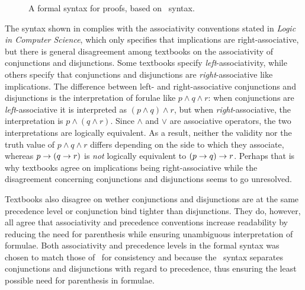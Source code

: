 \documentclass[BA.tex]{subfiles}
\begin{document}
\begin{figure}[H]

\caption{A formal syntax for proofs, based on \bp\ syntax.}
\label{fproof}
\end{figure}


The syntax shown in  complies with the associativity 
conventions stated in \emph{Logic in Computer Science}\cite[p.~5]{hr}, which
only specifies that implications are right-associative, but there is
general disagreement among textbooks on the associativity of conjunctions
and disjunctions. Some textbooks specify 
\emph{left}-associativity\cite[p.~46]{disc}, while others specify that 
conjunctions and disjunctions are \emph{right}-associative like 
implications\cite[p.~11]{math}\cite[p.~5]{calc}. The difference between
left- and right-associative conjunctions and disjunctions is the
interpretation of forulae like \(p \land q \land r\): when conjunctions are
\emph{left}-associative it is interpreted as \((p \land q) \land r\), but
when \emph{right}-associative, the interpretation is \(p \land (q \land r)\).
Since \(\land\) and \(\lor\) are associative operators, the two 
interpretations are logically equivalent. 
As a result, neither the validity nor the truth value of
\(p \land q \land r\) differs depending on the side to which they
associate, whereas \(p \rightarrow (q \rightarrow r)\) is \emph{not} logically equivalent
to \((p \rightarrow q) \rightarrow r\). Perhaps that is why textbooks agree on implications
being right-associative while the disagreement concerning conjunctions and
disjunctions seems to go unresolved.

Textbooks also disagree on wether conjunctions and disjunctions
are at the same precedence level\cite{hr} or conjunction bind tighter than
disjunctions\cite{math}\cite{calc}\cite{disc}. They do, however, all
agree that associativity and precedence conventions increase readability
by reducing the need for parenthesis while ensuring unambiguous
interpretation of 
formulae\cite[p.~5]{hr}\cite[p.~46]{disc}\cite[p.~10]{math}\cite[p.~5]{calc}.
Both associativity and precedence levels in the formal syntax was chosen 
to match those of \bp\ for consistency and because the \bp\ syntax separates
conjunctions and disjunctions with regard to precedence, thus ensuring the
least possible need for parenthesis in formulae.
\end{document}
